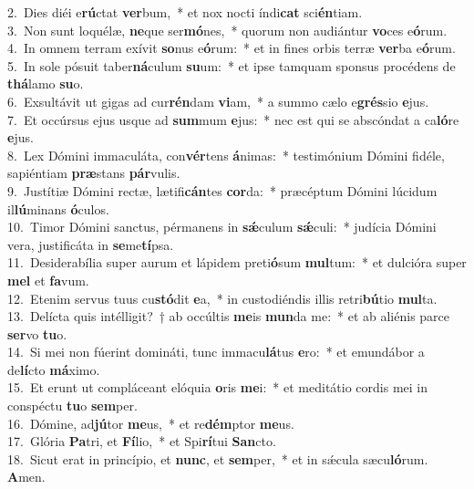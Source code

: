 {2.~}Dies diéi e\textbf{rú}ctat \textbf{ver}bum,~* et nox nocti índi\textbf{cat} sci\textbf{én}tiam.\\
{3.~}Non sunt loquélæ, \textbf{ne}que ser\textbf{mó}nes,~* quorum non audiántur \textbf{vo}ces e\textbf{ó}rum.\\
{4.~}In omnem terram exívit \textbf{so}nus e\textbf{ó}rum:~* et in fines orbis terræ \textbf{ver}ba e\textbf{ó}rum.\\
{5.~}In sole pósuit taber\textbf{ná}culum \textbf{su}um:~* et ipse tamquam sponsus procédens de \textbf{thá}lamo \textbf{su}o.\\
{6.~}Exsultávit ut gigas ad cur\textbf{rén}dam \textbf{vi}am,~* a summo cælo e\textbf{grés}sio \textbf{e}jus.\\
{7.~}Et occúrsus ejus usque ad \textbf{sum}mum \textbf{e}jus:~* nec est qui se abscóndat a ca\textbf{ló}re \textbf{e}jus.\\
{8.~}Lex Dómini immaculáta, con\textbf{vér}tens \textbf{á}nimas:~* testimónium Dómini fidéle, sapiéntiam \textbf{præ}stans \textbf{pár}vulis.\\
{9.~}Justítiæ Dómini rectæ, lætifi\textbf{cán}tes \textbf{cor}da:~* præcéptum Dómini lúcidum il\textbf{lú}minans \textbf{ó}culos.\\
{10.~}Timor Dómini sanctus, pérmanens in \textbf{sǽ}culum \textbf{sǽ}culi:~* judícia Dómini vera, justificáta in \textbf{se}me\textbf{tí}psa.\\
{11.~}Desiderabília super aurum et lápidem preti\textbf{ó}sum \textbf{mul}tum:~* et dulcióra super \textbf{mel} et \textbf{fa}vum.\\
{12.~}Etenim servus tuus cu\textbf{stó}dit \textbf{e}a,~* in custodiéndis illis retri\textbf{bú}tio \textbf{mul}ta.\\
{13.~}Delícta quis intélligit?~† ab occúltis \textbf{me}is \textbf{mun}da me:~* et ab aliénis parce \textbf{ser}vo \textbf{tu}o.\\
{14.~}Si mei non fúerint domináti, tunc immacu\textbf{lá}tus \textbf{e}ro:~* et emundábor a de\textbf{lí}cto \textbf{má}ximo.\\
{15.~}Et erunt ut compláceant elóquia \textbf{o}ris \textbf{me}i:~* et meditátio cordis mei in conspéctu \textbf{tu}o \textbf{sem}per.\\
{16.~}Dómine, ad\textbf{jú}tor \textbf{me}us,~* et re\textbf{dém}ptor \textbf{me}us.\\
{17.~}Glória \textbf{Pa}tri, et \textbf{Fí}lio,~* et Spi\textbf{rí}tui \textbf{San}cto.\\
{18.~}Sicut erat in princípio, et \textbf{nunc}, et \textbf{sem}per,~* et in sǽcula sæcu\textbf{ló}rum. \textbf{A}men.\\
